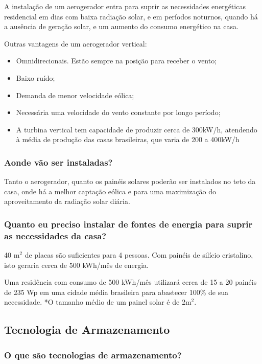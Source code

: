 	A instalação de um aerogerador entra para suprir as necessidades energéticas residencial em dias com baixa radiação solar, e em períodos noturnos, quando há a ausência de geração solar, e um aumento do consumo energético na casa.\cite{energygovplanning}\cite{globoaerogeradores}

	Outras vantagens de um aerogerador vertical: 
	\begin{itemize}
		\item Omnidirecionais. Estão sempre na posição para receber o vento;
		\item Baixo ruído;
		\item Demanda de menor velocidade eólica;
		\item Necessária uma velocidade do vento constante por longo período;
		\item A turbina vertical tem capacidade de produzir cerca de 300kW/h, atendendo à média de produção das casas brasileiras, que varia de 200 a 400kW/h
	\end{itemize}

\subsubsection{Aonde vão ser instaladas?}

	Tanto o aerogerador, quanto os painéis solares poderão ser instalados no teto da casa, onde há a melhor captação eólica e para uma maximização do aproveitamento da radiação solar diária. 
	
\subsubsection{Quanto eu preciso instalar de fontes de energia para suprir as necessidades da casa?}

	40 m$^{2}$ de placas são suficientes para 4 pessoas. Com painéis de silício cristalino, isto geraria cerca de 500 kWh/mês de energia.

	Uma residência com consumo de 500 kWh/mês utilizará cerca de 15 a 20 painéis de 235 Wp em uma cidade média brasileira para abastecer 100\% de sua necessidade. *O tamanho médio de um painel solar é de 2m$^{2}$. 

\subsection{Tecnologia de Armazenamento}
\subsubsection{O que são tecnologias de armazenamento?}

